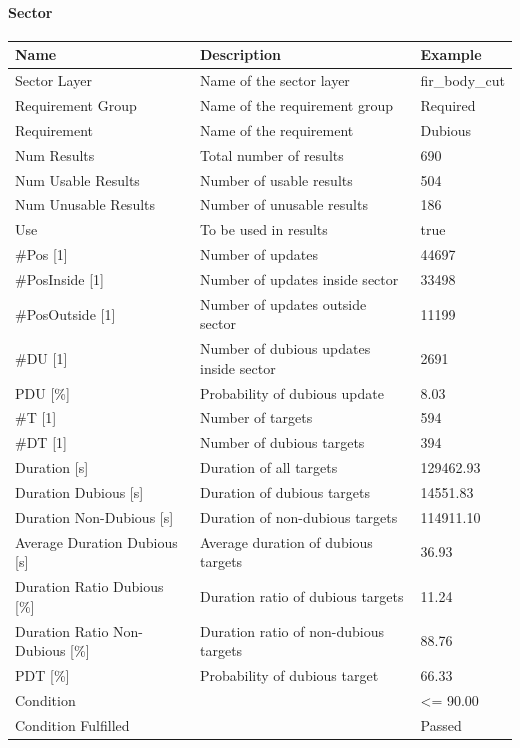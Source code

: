 \paragraph{Sector}

\begin{center}
 \begin{table}[H]
  \begin{tabularx}{\textwidth}{ | l | X |  l | }
    \hline
    \textbf{Name} & \textbf{Description} & \textbf{Example} \\ \hline
    Sector Layer & Name of the sector layer & fir\_body\_cut \\ \hline
    Requirement Group & Name of the requirement group & Required \\ \hline
    Requirement & Name of the requirement & Dubious \\ \hline
    Num Results & Total number of results & 690 \\ \hline
    Num Usable Results & Number of usable results & 504 \\ \hline
    Num Unusable Results & Number of unusable results & 186 \\ \hline
    Use & To be used in results & true \\ \hline
    \#Pos [1] & Number of updates & 44697 \\ \hline
    \#PosInside [1] & Number of updates inside sector & 33498 \\ \hline
    \#PosOutside [1] & Number of updates outside sector & 11199 \\ \hline
    \#DU [1] & Number of dubious updates inside sector & 2691 \\ \hline
    PDU [\%] & Probability of dubious update & 8.03 \\ \hline
    \#T [1] & Number of targets & 594 \\ \hline
    \#DT [1] & Number of dubious targets & 394 \\ \hline
    Duration [s] & Duration of all targets & 129462.93 \\ \hline
    Duration Dubious [s] & Duration of dubious targets & 14551.83 \\ \hline
    Duration Non-Dubious [s] & Duration of non-dubious targets & 114911.10 \\ \hline
    Average Duration Dubious [s] & Average duration of dubious targets & 36.93 \\ \hline
    Duration Ratio Dubious [\%] & Duration ratio of dubious targets & 11.24 \\ \hline
    Duration Ratio Non-Dubious [\%] & Duration ratio of non-dubious targets & 88.76 \\ \hline
    PDT [\%] & Probability of dubious target & 66.33 \\ \hline
    Condition &  & <= 90.00 \\ \hline
    Condition Fulfilled &  & Passed \\ \hline
\end{tabularx}
\end{table}
\end{center}

